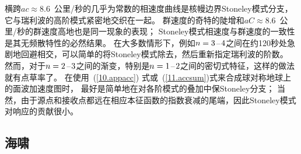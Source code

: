 横跨$ac\approx 8.6$~公里/秒的几乎为常数的相速度曲线是核幔边界Stoneley模式分支，它与瑞利波的高阶模式紧密地交织在一起。
%
%
群速度的奇特的陡增和$aC\approx 8.6$~公里/秒的群速度高地也是同一现象的表现；
Stoneley模式相速度与群速度的一致性是其无频散特性的必然结果。
在大多数情形下，例如$n=3\hspace{0.2 mm}$--$\hspace{0.2 mm}4$之间在约120秒处急剧地回避相交，可以简单的将Stoneley模式除去，然后重新指定瑞利波的阶数。 
然而，对于$n=2\hspace{0.2 mm}$--$\hspace{0.2 mm}3$之间的渐变，特别是$n=1\hspace{0.2 mm}$--$\hspace{0.2 mm}2$之间的密切式特征，这样的做法就有点草率了。
在使用~(\ref{10.appacc}) 式或~(\ref{11.accsum})式来合成球对称地球上的面波加速度图时，
最好是简单地在对各阶模式的叠加中保Stoneley分支；
当然，由于源点和接收点都远在相应本征函数的指数衰减的尾端，因此Stoneley模式对响应的贡献很小。
%
%

\renewcommand{\thesubsection}{$\!\!\!\raise1.3ex\hbox{$\star$}\!\!$
\arabic{chapter}.\arabic{section}.\arabic{subsection}}
\subsection{海啸}
%
\renewcommand{\thesubsection}{\arabic{chapter}.\arabic{section}.\arabic{subsection}}


